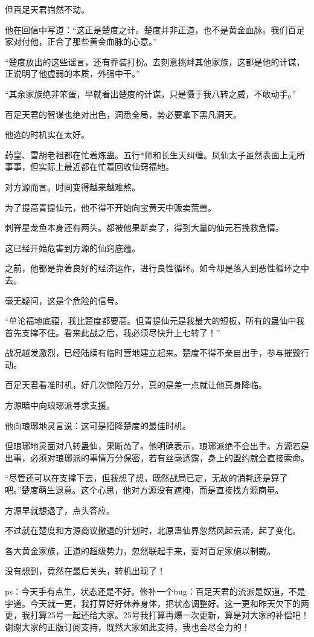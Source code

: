 \begin{this_body}
但百足天君岿然不动。

他在回信中写道：“这正是楚度之计。楚度并非正道，也不是黄金血脉。我们百足家对付他，正合了那些黄金血脉的心意。”

“楚度放出的这些谣言，还有乔装打扮。去刻意挑衅其他家族，这都是他的计谋，正说明了他虚弱的本质，外强中干。”

“其余家族绝非笨蛋，早就看出楚度的计谋，只是慑于我八转之威，不敢动手。”

百足天君的智谋也绝对出色，洞悉全局，势必要拿下黑凡洞天。

他选的时机实在太好。

药皇、雪胡老祖都在忙着炼蛊。五行*师和长生天纠缠。凤仙太子虽然表面上无所事事，但实际上最近都在忙着回收仙窍福地。

对方源而言。时间变得越来越难熬。

为了提高青提仙元，他不得不开始向宝黄天中贩卖荒兽。

刺脊星龙鱼本身还有两头。都被他果断卖了，得到大量的仙元石挽救危情。

这已经开始危害到方源的仙窍底蕴。

之前，他都是靠着良好的经济运作，进行良性循环。如今却是落入到恶性循环之中去。

毫无疑问，这是个危险的信号。

“单论福地底蕴，我比楚度都要高。但青提仙元是我最大的短板，所有的蛊仙中我首先支撑不住。看来此战之后，我必须尽快升上七转了！”

战况越发激烈，已经陆续有临时营地建立起来。楚度不得不亲自出手，参与摧毁行动。

百足天君看准时机，好几次惊险万分，真的是差一点就让他真身降临。

方源暗中向琅琊派寻求支援。

他向琅琊地灵言说：这可是招降楚度的最佳时机。

但琅琊地灵面对八转蛊仙，果断怂了。他明确表示，琅琊派绝不会出手。方源若是出事，必须对琅琊派的事情万分保密，若有丝毫透露，身上的盟约就会直接索命。

“尽管还可以在支撑下去，但我想了想，既然战局已定，无故的消耗还是算了吧。”楚度萌生退意。这个心思，他对方源没有遮掩，而是直接找方源商量。

方源早就想退了，点头答应。

不过就在楚度和方源商议撤退的计划时，北原蛊仙界忽然风起云涌，起了变化。

各大黄金家族，正道的超级势力，忽然联起手来，要对百足家施以制裁。

没有想到，竟然在最后关头，转机出现了！

ps：今天手有点生，状态还是不好。修补一个bug：百足天君的流派是奴道，不是宇道。今天就一更，我打算好好休养身体，把状态调整好。这一更和昨天欠下的两更，我打算25号一起还给大家。25号我打算再爆一次更新，算是对大家的补偿吧！谢谢大家的正版订阅支持，既然大家如此支持，我也会尽全力的！

\end{this_body}

